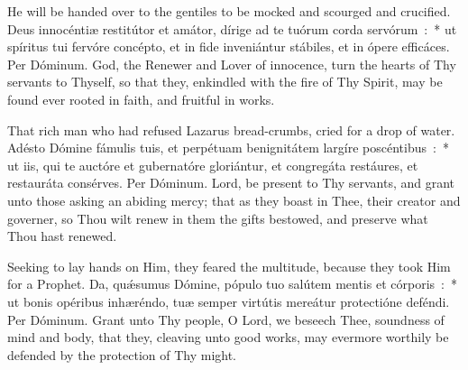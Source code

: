 {{  


  {He will be handed over to the gentiles to be mocked and scourged and crucified.}
  {Deus innocéntiæ restitútor et amátor, dírige ad te tuórum corda servórum~:~* ut spíritus tui fervóre concépto, et in fide inveniántur stábiles, et in ópere efficáces. Per Dóminum.}
  {God, the Renewer and Lover of innocence, turn the hearts of Thy servants to Thyself, so that they, enkindled with the fire of Thy Spirit, may be found ever rooted in faith, and fruitful in works.}

  {That rich man who had refused Lazarus bread-crumbs, cried for a drop of water.}
  {Adésto Dómine fámulis tuis, et perpétuam benignitátem largíre poscéntibus~:~* ut iis, qui te auctóre et gubernatóre gloriántur, et congregáta restáures, et restauráta consérves. Per Dóminum.}
  {Lord, be present to Thy servants, and grant unto those asking an abiding mercy; that as they boast in Thee, their creator and governer, so Thou wilt renew in them the gifts bestowed, and preserve what Thou hast renewed.}

  {Seeking to lay hands on Him, they feared the multitude, because they took Him for a Prophet.}
  {Da, quǽsumus Dómine, pópulo tuo salútem mentis et córporis~:~* ut bonis opéribus inhæréndo, tuæ semper virtútis mereátur protectióne deféndi. Per Dóminum.}
  {Grant unto Thy people, O Lord, we beseech Thee, soundness of mind and body, that they, cleaving unto good works, may evermore worthily be defended by the protection of Thy might.}

}}

